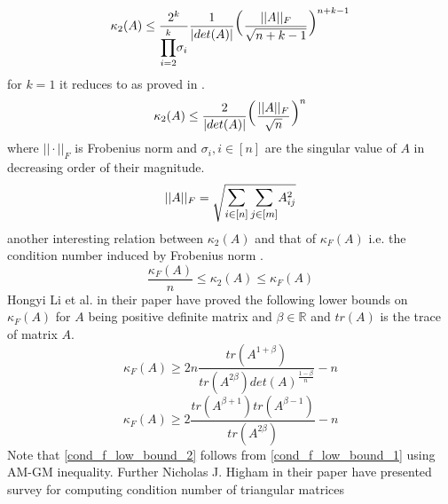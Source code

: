 \begin{equation} \label{cond_matx_ub_1}
    \kappa_2 (A) \le \frac{2^k}{\mathlarger{\prod_{i=2}^{k}} \sigma_i}\frac{1}{|det(A)|}\mathlarger{\mathlarger{\mathlarger{\mathlarger{(}}}} \frac{||A||_F}{\sqrt{n+k-1}}\mathlarger{\mathlarger{\mathlarger{\mathlarger{)}}}} ^{n+k-1}
\end{equation}
for $k=1$ it reduces to as proved in \cite{guggenheimer1995simple}.
\begin{equation} \label{cond_matx_ub_1.1}
    \kappa_2 (A) \le \frac{2}{|det(A)|}\mathlarger{\mathlarger{\mathlarger{\mathlarger{(}}}} \frac{||A||_F}{\sqrt{n}}\mathlarger{\mathlarger{\mathlarger{\mathlarger{) }}}} ^{n}
\end{equation}
where $||\cdot||_F$ is Frobenius norm and $\sigma_i, i\in [n]$ are the singular value of $A$ in decreasing order of their magnitude.
\begin{equation} \label{frobenius_norm}
    ||A||_F = \sqrt{ \mathlarger{\sum_{i \in [n]} \sum_{j \in [m]}} A^{2}_{ij}} 
\end{equation}
another interesting relation between $\kappa_2(A)$ and that of $\kappa_F(A)$ i.e. the condition number induced by Frobenius norm \cite{datta1995numerical}\cite{chehab2008geometrical}.
\begin{equation} \label{cond_2_rel_cond_forb}
    \frac{\kappa_F(A)}{n} \le \kappa_2(A) \le \kappa_F(A)
\end{equation}
Hongyi Li et al. in their paper \cite{li2011note} have proved the following lower bounds on $\kappa_F(A)$ for $A$ being positive definite matrix and $\beta \in \mathbb{R}$ and $tr(A)$ is the trace of matrix $A$.
\begin{equation} \label{cond_f_low_bound_1}
    \kappa_F(A) \ge 2n\frac{tr(A^{1+\beta})}{tr(A^{2\beta})det(A)^{\frac{1-\beta}{n}}} -n
\end{equation}
\begin{equation} \label{cond_f_low_bound_2}
    \kappa_F(A) \ge 2\frac{tr(A^{\beta+1})tr(A^{\beta-1})}{tr(A^{2\beta})} -n
\end{equation}
Note that \ref{cond_f_low_bound_2} follows from \ref{cond_f_low_bound_1} using AM-GM inequality. Further Nicholas J. Higham in their paper \cite{higham1987survey} have presented survey for computing condition number of triangular matrices
\newpage
